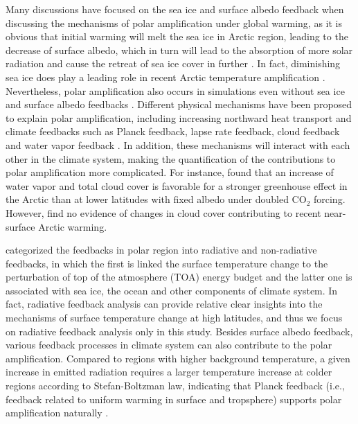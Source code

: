 Many discussions have focused on the sea ice and surface albedo feedback when discussing the mechanisms of polar amplification under global warming, as it is obvious that initial warming will melt the sea ice in Arctic region, leading to the decrease of surface albedo, which in turn will lead to the absorption of more solar radiation and cause the retreat of sea ice cover in further \citep{Serreze2011}. In fact, diminishing sea ice does play a leading role in recent Arctic temperature amplification \citep{Screen2010}. Nevertheless, polar amplification also occurs in simulations even without sea ice and surface albedo feedbacks \citep[e.g.,][]{Alexeev2005,Langen2012,Cai2005,Cai2006}. Different physical mechanisms have been proposed to explain polar amplification, including increasing northward heat transport \citep{Alexeev2005} and climate feedbacks such as Planck feedback, lapse rate feedback, cloud feedback and water vapor feedback \citep{Pithan2014,Screen2010,Vavrus2004}. In addition, these mechanisms will interact with each other in the climate system, making the quantification of the contributions to polar amplification more complicated. For instance, \cite{Graversen2009} found that an increase of water vapor and total cloud cover is favorable for a stronger greenhouse effect in the Arctic than at lower latitudes with fixed albedo under doubled CO$_2$ forcing. However, \cite{Screen2010} find no evidence of changes in cloud cover contributing to recent near-surface Arctic warming.
 
\cite{Goosse2018} categorized the feedbacks in polar region into radiative and non-radiative feedbacks, in which the first is linked the surface temperature change to the perturbation of top of the atmosphere (TOA) energy budget and the latter one is associated with sea ice, the ocean and other components of climate system. In fact, radiative feedback analysis can provide relative clear insights into the mechanisms of surface temperature change at high latitudes, and thus we focus on radiative feedback analysis only in this study. Besides surface albedo feedback, various feedback processes in climate system can also contribute to the polar amplification. Compared to regions with higher background temperature, a given increase in emitted radiation requires a larger temperature increase at colder regions according to Stefan-Boltzman law, indicating that Planck feedback (i.e., feedback related to uniform warming in surface and tropsphere) supports polar amplification naturally \citep{Pithan2014}.

